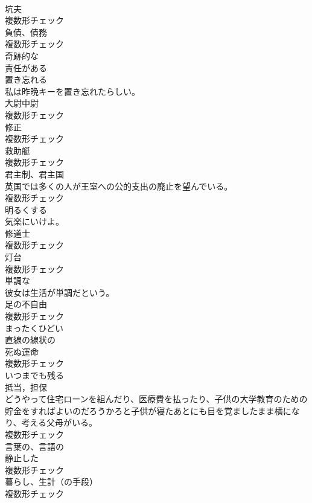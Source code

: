 \documentclass[8pt]{extreport}
\begin{document}
\begin{CJK}{UTF8}{min}
\\	[名詞]	坑夫	
\\	複数形チェック
\\	[名詞]	負債、債務	
\\	複数形チェック
\\	[形容詞]	奇跡的な	
\\	[形容詞]	責任がある	
\\	[動詞]	置き忘れる	
\\	私は昨晩キーを置き忘れたらしい。	
\\	[名詞]	大尉中尉	
\\	複数形チェック
\\	[名詞]	修正	
\\	複数形チェック
\\	[名詞]	救助艇	
\\	複数形チェック
\\	[名詞]	君主制、君主国	
\\	英国では多くの人が王室への公的支出の廃止を望んでいる。	
\\	複数形チェック
\\	[動詞]	明るくする	
\\	気楽にいけよ。	
\\	[名詞]	修道士	
\\	複数形チェック
\\	[名詞]	灯台	
\\	複数形チェック
\\	[形容詞]	単調な	
\\	彼女は生活が単調だという。	
\\	[名詞]	足の不自由	
\\	複数形チェック
\\	[形容詞]	まったくひどい	
\\	[形容詞]	直線の線状の	
\\	[名詞]	死ぬ運命	
\\	複数形チェック
\\	[動詞]	いつまでも残る	
\\	[名詞]	抵当，担保	
\\	どうやって住宅ローンを組んだり、医療費を払ったり、子供の大学教育のための貯金をすればよいのだろうかろと子供が寝たあとにも目を覚ましたまま横になり、考える父母がいる。	
\\	複数形チェック
\\	[形容詞]	言葉の、言語の	
\\	[名詞]	静止した	
\\	複数形チェック
\\	[名詞]	暮らし、生計（の手段）	
\\	複数形チェック

\end{CJK}
\end{document}
